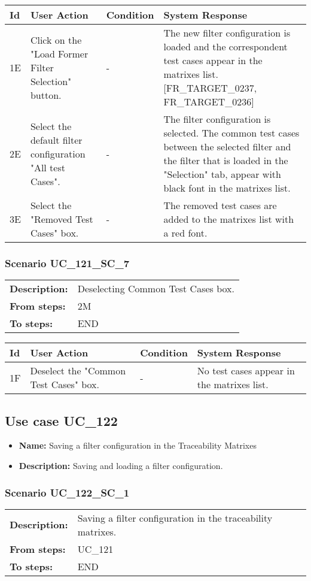 \documentclass[a4paper,11pt]{article}
\newcommand{\bl}{\\ \hline}
\begin{document}
\begin{tabular}{|p{0.8in}|p{1.6in}|p{1.6in}|p{1.6in}|}
\hline
Id & User Action & Condition & System Response  \bl 
1E & Click on the "Load Former Filter Selection" button. & - & The new filter configuration is loaded and the correspondent test cases appear in the matrixes list. [FR_TARGET_0237, FR_TARGET_0236] \bl 
2E & Select the default filter configuration "All test Cases". & - & The filter configuration is selected. The common test cases between the selected filter and the filter that is loaded in the "Selection" tab, appear with black font in the matrixes list. \bl 
3E & Select the "Removed Test Cases" box. & - & The removed test cases are added to the matrixes list with a red font. \bl 
\end{tabular}
\subsubsection*{Scenario UC_121_SC_7}
\begin{tabular}{p{1in}p{4in}}
{\bf Description:} & Deselecting Common Test Cases box. \\
{\bf From steps:} & 2M \\
{\bf To steps:} & END \\
\end{tabular}
 
\begin{tabular}{|p{0.8in}|p{1.6in}|p{1.6in}|p{1.6in}|}
\hline
Id & User Action & Condition & System Response  \bl 
1F & Deselect the "Common Test Cases" box. & - & No test cases appear in the matrixes list. \bl 
\end{tabular}
\subsection*{Use case UC_122}
\begin{itemize}
\item {\bf Name: }Saving a filter configuration in the Traceability Matrixes
\item {\bf Description: }Saving and loading a filter configuration.
\end{itemize}
\subsubsection*{Scenario UC_122_SC_1}
\begin{tabular}{p{1in}p{4in}}
{\bf Description:} & Saving a filter configuration in the traceability matrixes. \\
{\bf From steps:} & UC_121#2A \\
{\bf To steps:} & END \\
\end{tabular}
 
\end{document}
